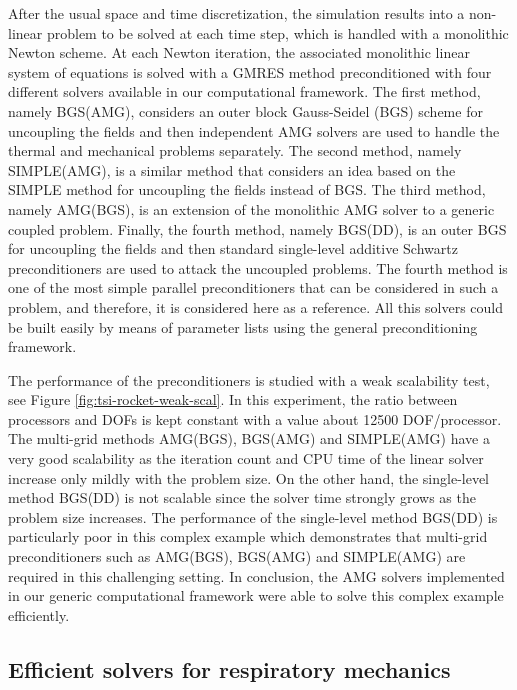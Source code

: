 \documentclass{article}
\begin{document}
After the usual space and time discretization, the simulation results into a non-linear problem to be solved at each time step, which is handled with a monolithic Newton scheme. At each Newton iteration, the associated monolithic linear system of equations is solved with a GMRES method preconditioned with four different solvers available in our computational framework. The first method, namely BGS(AMG), considers an outer block Gauss-Seidel (BGS) scheme for uncoupling the fields and then independent AMG solvers are used to handle the  thermal and mechanical problems separately. The second method, namely SIMPLE(AMG), is a similar method that considers an idea based on the SIMPLE method \cite{elman_2008} for uncoupling the fields instead of BGS. The third method, namely AMG(BGS), is an extension of the monolithic AMG solver to a generic coupled problem. Finally, the fourth method, namely BGS(DD), is an outer BGS for uncoupling the fields and then standard single-level additive Schwartz preconditioners are used to attack the uncoupled problems. The fourth  method is one of the most simple parallel preconditioners that can be considered in such a problem, and therefore, it is considered here as a reference.  All this solvers could be built easily by means of parameter lists using the general preconditioning framework. 

The performance of the preconditioners is studied with a weak scalability test, see Figure \ref{fig:tsi-rocket-weak-scal}. In this experiment, the ratio between processors and DOFs is kept constant with a value about 12500  DOF/processor. The multi-grid methods AMG(BGS), BGS(AMG) and SIMPLE(AMG) have a very good scalability as the iteration count and CPU time of the linear solver increase only mildly with the problem size. On the other hand, the single-level method BGS(DD) is not scalable since the solver time strongly  grows as the problem size increases. The performance of the single-level method BGS(DD) is particularly poor in this complex example which demonstrates that multi-grid preconditioners such as  AMG(BGS), BGS(AMG) and SIMPLE(AMG) are required in this challenging setting.  In conclusion, the AMG solvers implemented in our generic computational framework were able to solve this complex example efficiently.

\subsection{Efficient solvers for respiratory mechanics}
\end{document}
